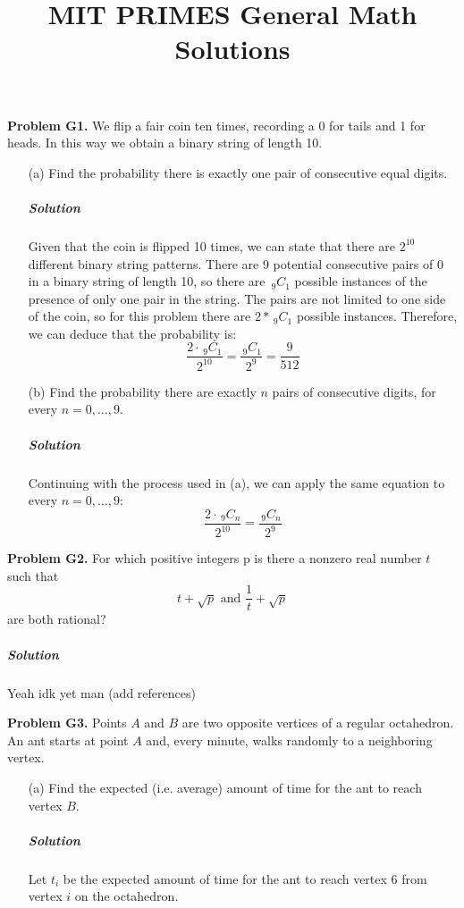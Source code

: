 \documentclass[a4paper]{amsart}
\title{MIT PRIMES General Math Solutions}
\newcommand{\nCr}[2]{\,_{#1}C_{#2}} %
\begin{document}
	\maketitle
	\begin{flushleft}
		\textbf{Problem G1.} We flip a fair coin ten times, recording a 0 for tails and 1 for heads. In this way we obtain a binary string of length 10.
		
		\begin{enumerate}
			\item[(a)] Find the probability there is exactly one pair of consecutive equal digits.
			
			\subparagraph{\textbf{Solution}} Given that the coin is flipped 10 times, we can state that there are $2^{10}$ different binary string patterns. There are 9 potential consecutive pairs of 0 in a binary string of length 10, so there are $\nCr{9}{1}$ possible instances of the presence of only one pair in the string. The pairs are not limited to one side of the coin, so for this problem there are $2*\nCr{9}{1}$ possible instances. Therefore, we can deduce that the probability is:
			\[ \frac{2\cdot\nCr{9}{1}}{2^{10}}=\frac{\nCr{9}{1}}{2^{9}}=\frac{9}{512} \]
			
			\item[(b)] Find the probability there are exactly $n$ pairs of consecutive digits, for every $n=0,\dotsc,9$.
			
			\subparagraph{\textbf{Solution}} Continuing with the process used in (a), we can apply the same equation to every $n=0,\dotsc,9$:
			\[ \frac{2\cdot\nCr{9}{n}}{2^{10}}=\frac{\nCr{9}{n}}{2^{9}} \]
		\end{enumerate}
		
		\textbf{Problem G2.} For which positive integers p is there a nonzero real number $t$ such that \[ t+\sqrt{p}  \text{ and } \frac{1}{t}+\sqrt{p}\] are both rational?
		
		\subparagraph{\textbf{Solution}} Yeah idk yet man (add references)
		
		\textbf{Problem G3.} Points $A$ and $B$ are two opposite vertices of a regular octahedron. An ant starts at point $A$ and, every minute, walks randomly to a neighboring vertex.
		
		\begin{enumerate}
			\item[(a)] Find the expected (i.e. average) amount of time for the ant to reach vertex $B$.
			
			\subparagraph{\textbf{Solution}} Let $t_i$ be the expected amount of time for the ant to reach vertex 6 from vertex $i$ on the octahedron.
			

\end{enumerate}
\end{flushleft}
\end{document}

